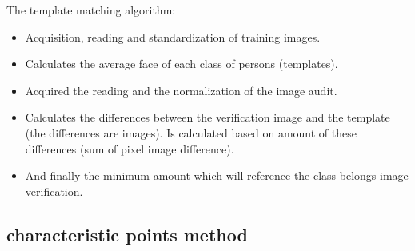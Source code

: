 The template matching algorithm:
\begin{itemize}
\item Acquisition, reading and standardization of training images.
\item Calculates the average face of each class of persons (templates).
\item Acquired the reading and the normalization of the image audit.
\item Calculates the differences between the verification image and the template (the differences are images).
Is calculated based on amount of these differences (sum of pixel image difference).
\item And finally the minimum amount which will reference the class belongs image verification.
\end{itemize}

\subsection{characteristic points method}
